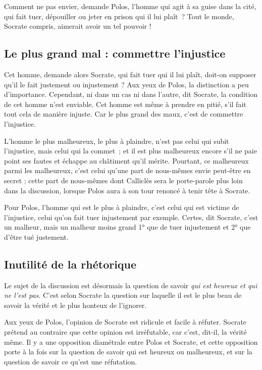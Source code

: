 \documentclass[a5paper,12pt]{article}
\begin{document}
Comment ne pas envier, demande Polos, l'homme qui agit à sa guise dans la cité, qui fait tuer, dépouiller ou jeter en prison qui il lui plaît~? Tout le monde, Socrate compris, aimerait avoir un tel pouvoir !

\subsection*{Le plus grand mal : commettre l'injustice}

Cet homme, demande alors Socrate, qui fait tuer qui il lui plaît, doit-on supposer qu'il le fait justement ou injustement ? Aux yeux de Polos, la distinction a peu d'importance. Cependant, ni dans un cas ni dans l'autre, dit Socrate, la condition de cet homme n'est enviable. Cet homme est même à prendre en pitié, s'il fait tout cela de manière injuste. Car le plus grand des maux, c'est de commettre l'injustice.

L'homme le plus malheureux, le plus à plaindre, n'est pas celui qui subit l'injustice, mais celui qui la commet~; et il est plus malheureux encore s'il ne paie point ses fautes et échappe au châtiment qu'il mérite. Pourtant, ce malheureux parmi les malheureux, c'est celui qu'une part de nous-mêmes envie peut-être en secret ; cette part de nous-mêmes dont Calliclès sera le porte-parole plus loin dans la discussion, lorsque Polos aura à son tour renoncé à tenir tête à Socrate.

Pour Polos, l'homme qui est le plus à plaindre, c'est celui qui est victime de l'injustice, celui qu'on fait tuer injustement par exemple. Certes, dit Socrate, c'est un malheur, mais un malheur moins grand 1° que de tuer injustement et 2° que d'être tué justement.

\subsection*{Inutilité de la rhétorique}

Le sujet de la discussion est désormais la question de savoir \emph{qui est heureux et qui ne l'est pas}. C'est selon Socrate la question sur laquelle il est le plus beau de savoir la vérité et le plus honteux de l'ignorer.

Aux yeux de Polos, l'opinion de Socrate est ridicule et facile à réfuter. Socrate prétend au contraire que cette opinion est irréfutable, car c'est, dit-il, la vérité même. Il y a une opposition diamétrale entre Polos et Socrate, et cette opposition porte à la fois sur la question de savoir qui est heureux ou malheureux, et sur la question de savoir ce qu'est une réfutation.
\end{document}
